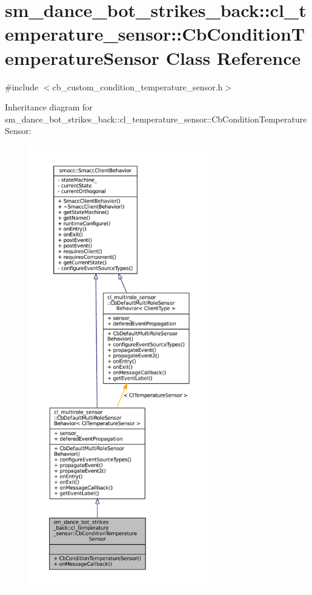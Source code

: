 \hypertarget{classsm__dance__bot__strikes__back_1_1cl__temperature__sensor_1_1CbConditionTemperatureSensor}{}\section{sm\+\_\+dance\+\_\+bot\+\_\+strikes\+\_\+back\+:\+:cl\+\_\+temperature\+\_\+sensor\+:\+:Cb\+Condition\+Temperature\+Sensor Class Reference}
\label{classsm__dance__bot__strikes__back_1_1cl__temperature__sensor_1_1CbConditionTemperatureSensor}


{\ttfamily \#include $<$cb\+\_\+custom\+\_\+condition\+\_\+temperature\+\_\+sensor.\+h$>$}



Inheritance diagram for sm\+\_\+dance\+\_\+bot\+\_\+strikes\+\_\+back\+:\+:cl\+\_\+temperature\+\_\+sensor\+:\+:Cb\+Condition\+Temperature\+Sensor\+:
\nopagebreak
\begin{figure}[H]
\begin{center}
\leavevmode
\includegraphics[height=550pt]{classsm__dance__bot__strikes__back_1_1cl__temperature__sensor_1_1CbConditionTemperatureSensor__inherit__graph}
\end{center}
\end{figure}


